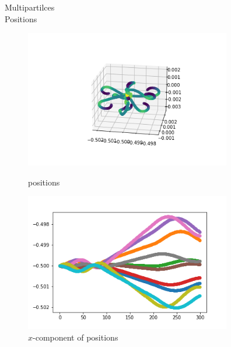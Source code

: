 \documentclass[12pt]{article}
\begin{document}
	Multipartilces\\
	Positions
	\begin{figure}[H]
		\begin{multicols}{2}
			\includegraphics[width=\linewidth, height=6cm]{multips2.png} \caption{positions} \label{multips2} \par
			\includegraphics[width=\linewidth, height=6cm]{multipsx2.png} \caption{$x$-component of positions} \label{multipsx2} \par
		\end{multicols}
	\end{figure}
\end{document}
